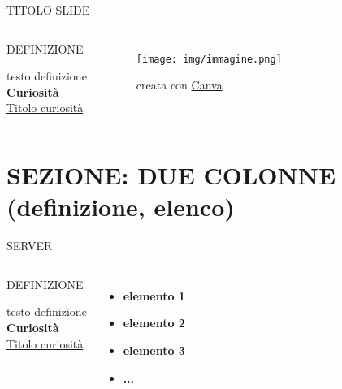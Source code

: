 \documentclass[aspectratio=1610]{beamer}
\begin{document}
\begin{frame}{TITOLO SLIDE}
    \begin{columns}
            \begin{alertblock}{DEFINIZIONE}
                \begin{minipage}{0.96\linewidth}
                    \justifying
                    testo definizione\\
                    \bigskip
                    \tiny{\textbf{Curiosità}}\\
                    \tiny{\href{www.link.com}{Titolo curiosità}}
                \end{minipage}
            \end{alertblock}
            \begin{figure}
                \texttt{[image: img/immagine.png]}
                \caption{{creata con \href{www.canva.com}{Canva}}}
            \end{figure}
    \end{columns}
\end{frame}

\section{SEZIONE: DUE COLONNE (definizione, elenco)}

\begin{frame}{SERVER}
    \begin{columns}
            \begin{alertblock}{DEFINIZIONE}
                \begin{minipage}{0.96\linewidth}
                    \justifying
                    testo definizione\\ 
                    \tiny{\textbf{Curiosità}}\\
                    \tiny{\href{www.link.com}{Titolo curiosità}}
                \end{minipage}
            \end{alertblock}
            \begin{itemize}
                \item \textbf{elemento 1}
                \item \textbf{elemento 2}
                \item \textbf{elemento 3}
                \item \textbf{...}
            \end{itemize}
    \end{columns}
\end{frame}
\end{document}

